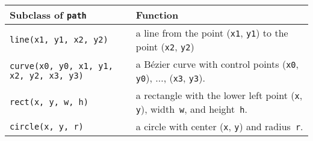 \medskip
\begin{tabularx}{\linewidth}{l>{\raggedright\arraybackslash}X}
Subclass of \texttt{path} & Function \\
\hline
\texttt{line(x1, y1, x2, y2)} & a line from the point
  (\texttt{x1}, \texttt{y1}) to the point (\texttt{x2}, \texttt{y2})\\
\texttt{curve(x0, y0, x1, y1, x2, y2, x3, y3)} & a B\'ezier curve with 
control points  (\texttt{x0}, \texttt{y0}), $\dots$, (\texttt{x3}, \texttt{y3}).\\
\texttt{rect(x, y, w, h)} &  a rectangle with the
  lower left point (\texttt{x}, \texttt{y}), width~\texttt{w}, and
  height~\texttt{h}. \\
\texttt{circle(x, y, r)} & a circle with 
  center (\texttt{x}, \texttt{y}) and radius~\texttt{r}.
\end{tabularx}
\medskip


